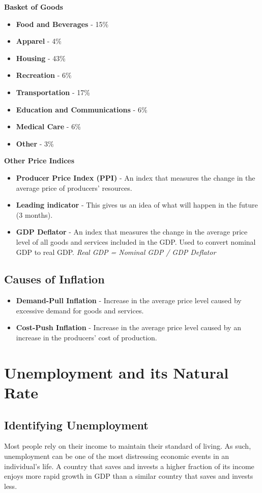 \documentclass{article}
\begin{document}
\textbf{Basket of Goods}
\begin{itemize}
    \item{\textbf{Food and Beverages} - 15\%}
    \item{\textbf{Apparel} - 4\%}
    \item{\textbf{Housing} - 43\%}
    \item{\textbf{Recreation} - 6\%}
    \item{\textbf{Transportation} - 17\%}
    \item{\textbf{Education and Communications} - 6\%}
    \item{\textbf{Medical Care} - 6\%}
    \item{\textbf{Other} - 3\%}
\end{itemize}

\textbf{Other Price Indices}
\begin{itemize}
    \item{\textbf{Producer Price Index (PPI)} - An index that measures the change in the average price of producers' resources.}
    \item{\textbf{Leading indicator} - This gives us an idea of what will happen in the future (3 months).}
    \item{\textbf{GDP Deflator} - An index that measures the change in the average price level of all goods and services included in the GDP. Used to convert nominal GDP to real GDP. \textit{Real GDP = Nominal GDP / GDP Deflator}}
\end{itemize}

\subsection{Causes of Inflation}
\begin{itemize}
    \item{\textbf{Demand-Pull Inflation} - Increase in the average price level caused by excessive demand for goods and services.}
    \item{\textbf{Cost-Push Inflation} - Increase in the average price level caused by an increase in the producers' cost of production.}
\end{itemize}

\section{Unemployment and its Natural Rate}
\subsection{Identifying Unemployment}
Most people rely on their income to maintain their standard of living. As such, unemployment can be one of the most distressing economic events in an individual's life. A country that saves and invests a higher fraction of its income enjoys more rapid growth in GDP than a similar country that saves and invests less.
\end{document}
